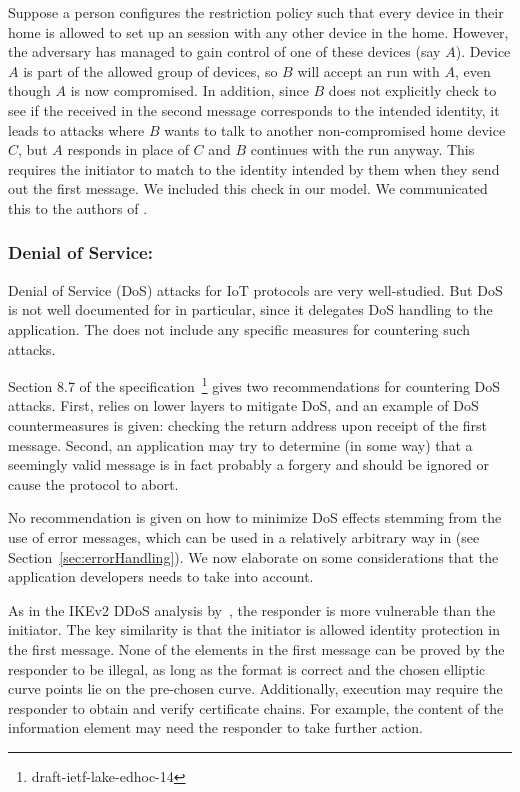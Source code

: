 \documentclass[runningheads]{llncs}
\begin{document}
Suppose a person configures the restriction policy such that every device in their home is allowed to set up an \mEdhoc{} session with any other device in the home.
%
However, the adversary has managed to gain control of one of these devices (say $A$).
%
Device $A$ is part of the allowed group of devices, so $B$ will accept an \mEdhoc{} run with $A$, even though $A$ is now compromised.
%
In addition, since $B$ does not explicitly check to see if the \mIdcredr{} received in the second message corresponds to the intended identity, it leads to attacks where $B$ wants to talk to another non-compromised home device $C$, but $A$ responds in place of $C$ and $B$ continues with the run anyway.
%
This requires the initiator to match \mIdcredr{} to the identity intended by them when they send out the first message.
%
We included this check in our model.
%
We communicated this to the authors of \mEdhoc{}.

\subsubsection{Denial of Service: }
Denial of Service (DoS) attacks for IoT protocols are very well-studied.
%
But DoS is not well documented for \mEdhoc{} in particular, since it delegates DoS handling to the application.
%
The \mSpec{} does not include any specific measures for countering such attacks.

Section 8.7 of the \mEdhoc{} specification~\footnote{draft-ietf-lake-edhoc-14} gives two recommendations for countering DoS attacks.
%
First, \mEdhoc{} relies on lower layers to mitigate DoS, and an example of DoS countermeasures is given: checking the return address upon receipt of the first message.
%
Second, an application may try to determine (in some way) that a seemingly valid message is in fact probably a forgery and should be ignored or cause the protocol to abort.

No recommendation is given on how to minimize DoS effects stemming from the use of error messages, which can be used in a relatively arbitrary way in \mEdhoc{} (see Section~\ref{sec:errorHandling}).
%
We now elaborate on some considerations that the application developers needs to take into account.
%

As in the IKEv2 DDoS analysis by~\cite{rfc8019}, the responder is more vulnerable than the initiator.
%
The key similarity is that the initiator is allowed identity protection in the first message.
%
None of the elements in the first \mEdhoc{} message can be proved by the responder to be illegal, as long as the format is correct and the chosen elliptic curve points lie on the pre-chosen curve.
%
Additionally, execution may require the responder to obtain and verify certificate chains.
%
For example, the content of the \mADone{} information element may need the responder to take further action.
%
\end{document}
